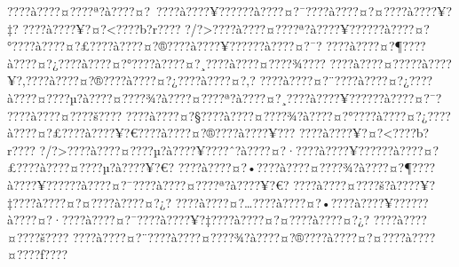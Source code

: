\documentclass[11pt, openany]{book}
\begin{document}
{{{{{{{{{{{{{{{{{{{{{{{{{{{{{{{{{{{{{{{{{{{{{{{{{{{{{{{{{{{{{{{{{{{{{{{{{{{{{{{{{{{{{{{{{{{{{{{{{{{{{{{{{{{{{???\textbar{}?à???\textbar{}?¤???\textbar{}?ª?à???\textbar{}?¤?~???\textbar{}?à???\textbar{}?¥?????\textbar{}?à???\textbar{}?¤?¯???\textbar{}?à???\textbar{}?¤?¤???\textbar{}?à???\textbar{}?¥?‡?
???\textbar{}?à???\textbar{}?¥?¤?\textless{}???\textbar{}?b?r???\textbar{}?
?/?\textgreater{}???\textbar{}?à???\textbar{}?¤???\textbar{}?ª?à???\textbar{}?¥?????\textbar{}?à???\textbar{}?¤?°???\textbar{}?à???\textbar{}?¤?£???\textbar{}?à???\textbar{}?¤?®???\textbar{}?à???\textbar{}?¥?????\textbar{}?à???\textbar{}?¤?¯?
???\textbar{}?à???\textbar{}?¤?¶???\textbar{}?à???\textbar{}?¤?¿???\textbar{}?à???\textbar{}?¤?°???\textbar{}?à???\textbar{}?¤?¸???\textbar{}?à???\textbar{}?¤???\textbar{}?¾???\textbar{}?
???\textbar{}?à???\textbar{}?¤?­???\textbar{}?à???\textbar{}?¥?‚???\textbar{}?à???\textbar{}?¤?®???\textbar{}?à???\textbar{}?¤?¿???\textbar{}?à???\textbar{}?¤?‚?
???\textbar{}?à???\textbar{}?¤?¨???\textbar{}?à???\textbar{}?¤?¿???\textbar{}?à???\textbar{}?¤???\textbar{}?µ?à???\textbar{}?¤???\textbar{}?¾?à???\textbar{}?¤???\textbar{}?ª?à???\textbar{}?¤?¸???\textbar{}?à???\textbar{}?¥?????\textbar{}?à???\textbar{}?¤?¯?
???\textbar{}?à???\textbar{}?¤???\textbar{}?š???\textbar{}?
???\textbar{}?à???\textbar{}?¤?§???\textbar{}?à???\textbar{}?¤???\textbar{}?¾?à???\textbar{}?¤?°???\textbar{}?à???\textbar{}?¤?¿???\textbar{}?à???\textbar{}?¤?£???\textbar{}?à???\textbar{}?¥?€???\textbar{}?à???\textbar{}?¤?®???\textbar{}?à???\textbar{}?¥???
???\textbar{}?à???\textbar{}?¥?¤?\textless{}???\textbar{}?b?r???\textbar{}?
?/?\textgreater{}???\textbar{}?à???\textbar{}?¤???\textbar{}?µ?à???\textbar{}?¥???\textbar{}?ˆ?à???\textbar{}?¤?·???\textbar{}?à???\textbar{}?¥?????\textbar{}?à???\textbar{}?¤?£???\textbar{}?à???\textbar{}?¤???\textbar{}?µ?à???\textbar{}?¥?€?
???\textbar{}?à???\textbar{}?¤?•???\textbar{}?à???\textbar{}?¤???\textbar{}?¾?à???\textbar{}?¤?¶???\textbar{}?à???\textbar{}?¥?????\textbar{}?à???\textbar{}?¤?¯???\textbar{}?à???\textbar{}?¤???\textbar{}?ª?à???\textbar{}?¥?€?
???\textbar{}?à???\textbar{}?¤???\textbar{}?š?à???\textbar{}?¥?‡???\textbar{}?à???\textbar{}?¤?¤???\textbar{}?à???\textbar{}?¤?¿?
???\textbar{}?à???\textbar{}?¤?\ldots{}???\textbar{}?à???\textbar{}?¤?•???\textbar{}?à???\textbar{}?¥?????\textbar{}?à???\textbar{}?¤?·???\textbar{}?à???\textbar{}?¤?¯???\textbar{}?à???\textbar{}?¥?‡???\textbar{}?à???\textbar{}?¤?¤???\textbar{}?à???\textbar{}?¤?¿?
???\textbar{}?à???\textbar{}?¤???\textbar{}?š???\textbar{}?
???\textbar{}?à???\textbar{}?¤?¨???\textbar{}?à???\textbar{}?¤???\textbar{}?¾?à???\textbar{}?¤?®???\textbar{}?à???\textbar{}?¤?¤???\textbar{}?à???\textbar{}?¤???\textbar{}?ƒ???\textbar{}?
}}}}}}}}}}}}}}}}}}}}}}}}}}}}}}}}}}}}}}}}}}}}}}}}}}}}}}}}}}}}}}}}}}}}}}}}}}}}}}}}}}}}}}}}}}}}}}}}}}}}}}}}}}}}}
\end{document}
